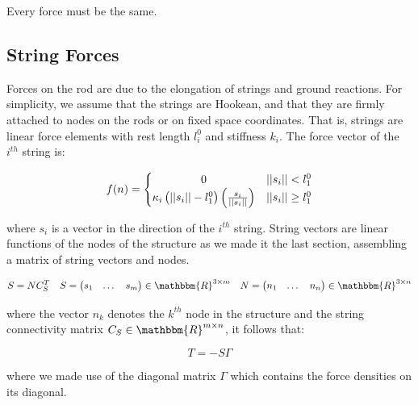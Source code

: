         Every force must be the same.


\subsection{String Forces}

    Forces on the rod are due to the elongation of strings and ground reactions.
    For simplicity, we assume that the strings are Hookean, and that they are firmly attached to nodes on the rods or on fixed space coordinates.
    That is, strings are linear force elements with rest length $l_i^0$ and stiffness $k_i$.
    The force vector of the $i^{th}$ string is:

    \begin{equation}
        f(n) =
        \begin{cases}
            \hfill 0    \hfill & ||s_i|| < l_1^0 \\
            \hfill \kappa_i \left( ||s_i|| - l_1^0 \right) \left( \frac{s_i}{||s_i||} \right) \hfill & ||s_i|| \ge l_1^0 \\
        \end{cases}
    \end{equation}

    where $s_i$ is a vector in the direction of the $i^{th}$ string.
    String vectors are linear functions of the nodes of the structure as we made it the last section, assembling a matrix of string vectors and nodes.

    \begin{equation}
        S = N C_S^T \quad
        S =
        \begin{pmatrix}
            s_1 & \dots & s_m
        \end{pmatrix} \in \mathbbm{R}^{3 \times m} \quad
        N =
        \begin{pmatrix}
            n_1 & \dots & n_n
        \end{pmatrix} \in \mathbbm{R}^{3 \times n}
        \end{equation}

    where the vector $n_k$ denotes the $k^{th}$ node in the structure and the string connectivity matrix $C_S \in \mathbbm{R}^{m \times n}$, it follows that:

    \begin{equation}
        T = - S \Gamma
    \end{equation}

    where we made use of the diagonal matrix $\Gamma$ which contains the force densities on its diagonal.

